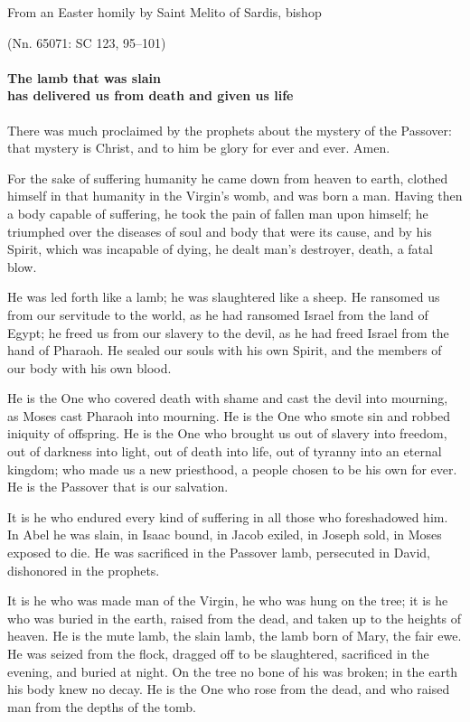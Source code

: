 From an Easter homily by Saint Melito of Sardis, bishop

\par \hfill(Nn. 65071: SC 123, 95--101)

\paragraph{The lamb that was slain\\ has delivered us from death and given us life}

\lettrine[lines=3]{T}{}here was much proclaimed by the prophets about the mystery of the Passover: that mystery is Christ, and to him be glory for ever and ever. Amen.

For the sake of suffering humanity he came down from heaven to earth, clothed himself in that humanity in the Virgin’s womb, and was born a man. Having then a body capable of suffering, he took the pain of fallen man upon himself; he triumphed over the diseases of soul and body that were its cause, and by his Spirit, which was incapable of dying, he dealt man’s destroyer, death, a fatal blow.

He was led forth like a lamb; he was slaughtered like a sheep. He ransomed us from our servitude to the world, as he had ransomed Israel from the land of Egypt; he freed us from our slavery to the devil, as he had freed Israel from the hand of Pharaoh. He sealed our souls with his own Spirit, and the members of our body with his own blood.

He is the One who covered death with shame and cast the devil into mourning, as Moses cast Pharaoh into mourning. He is the One who smote sin and robbed iniquity of offspring. He is the One who brought us out of slavery into freedom, out of darkness into light, out of death into life, out of tyranny into an eternal kingdom; who made us a new priesthood, a people chosen to be his own for ever. He is the Passover that is our salvation.

It is he who endured every kind of suffering in all those who foreshadowed him. In Abel he was slain, in Isaac bound, in Jacob exiled, in Joseph sold, in Moses exposed to die. He was sacrificed in the Passover lamb, persecuted in David, dishonored in the prophets.

It is he who was made man of the Virgin, he who was hung on the tree; it is he who was buried in the earth, raised from the dead, and taken up to the heights of heaven. He is the mute lamb, the slain lamb, the lamb born of Mary, the fair ewe. He was seized from the flock, dragged off to be slaughtered, sacrificed in the evening, and buried at night. On the tree no bone of his was broken; in the earth his body knew no decay. He is the One who rose from the dead, and who raised man from the depths of the tomb.

